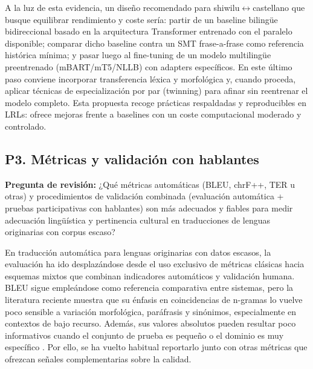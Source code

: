 \documentclass[12pt,a4paper,oneside]{book}
\begin{document}
A la luz de esta evidencia, un diseño recomendado para shiwilu$\leftrightarrow$castellano que busque equilibrar rendimiento y coste sería: partir de un baseline bilingüe bidireccional basado en la arquitectura Transformer \parencite{vaswani2017} entrenado con el paralelo disponible; comparar dicho baseline contra un SMT frase-a-frase como referencia histórica mínima; y pasar luego al fine-tuning de un modelo multilingüe preentrenado (mBART/mT5/NLLB) con adapters específicos. En este último paso conviene incorporar transferencia léxica y morfológica y, cuando proceda, aplicar técnicas de especialización por par (twinning) para afinar sin reentrenar el modelo completo. Esta propuesta recoge prácticas respaldadas y reproducibles en LRLs: ofrece mejoras frente a baselines con un coste computacional moderado y controlado.

\subsection{P3. Métricas y validación con hablantes}\label{quuxe9-muxe9tricas-automuxe1ticas-bleu-chrf-ter-etc.-y-procedimientos-de-validaciuxf3n-combinada-evaluaciuxf3n-automuxe1tica-pruebas-participativas-con-hablantes-son-muxe1s-adecuados-y-fiables-para-medir-adecuaciuxf3n-linguxfcuxedstica-y-pertinencia-cultural-en-traducciones-de-lenguas-originarias-con-corpus-escaso}

\noindent\textbf{Pregunta de revisión:} ¿Qué métricas automáticas (BLEU, chrF++, TER u otras) y procedimientos de validación combinada (evaluación automática + pruebas participativas con hablantes) son más adecuados y fiables para medir adecuación lingüística y pertinencia cultural en traducciones de lenguas originarias con corpus escaso?

En traducción automática para lenguas originarias con datos escasos, la evaluación ha ido desplazándose desde el uso exclusivo de métricas clásicas hacia esquemas mixtos que combinan indicadores automáticos y validación humana. BLEU sigue empleándose como referencia comparativa entre sistemas, pero la literatura reciente muestra que su énfasis en coincidencias de n-gramas lo vuelve poco sensible a variación morfológica, paráfrasis y sinónimos, especialmente en contextos de bajo recurso. Además, sus valores absolutos pueden resultar poco informativos cuando el conjunto de prueba es pequeño o el dominio es muy específico \parencite{post2018,roy2024}. Por ello, se ha vuelto habitual reportarlo junto con otras métricas que ofrezcan señales complementarias sobre la calidad.
\end{document}
